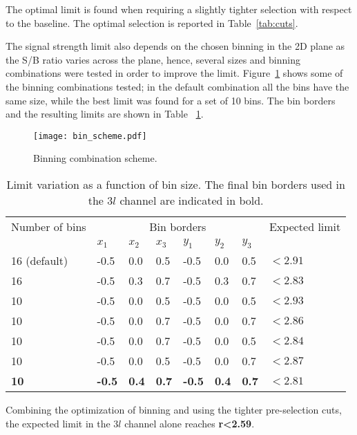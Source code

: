 The optimal limit is found when requiring a slightly tighter selection with respect to the baseline. The optimal selection is reported in Table~\ref{tab:cuts}.

The signal strength limit also depends on the chosen binning in the 2D plane as the S/B ratio varies across the plane, hence, several sizes and binning combinations were tested in order to improve the limit. Figure~\ref{bins} shows some of the binning combinations tested; in the default combination all the bins have the same size, while the best limit was found for a set of 10 bins. The bin borders and the resulting limits are shown in Table ~\ref{bin_limits}.

\begin{figure} [!h]
 \centering
 \texttt{[image: bin\_scheme.pdf]} 
\caption{Binning combination scheme.}
\label{bins}
\end{figure}

\begin{table}[h!]
\centering
\begin{tabular}{llllllll}\hline
Number of bins  & \multicolumn{6}{c}{Bin borders}  & Expected limit \\%
                &$x_1$&$x_2$&$x_3$&$y_1$&$y_2$&$y_3$&\\\hline           
16 (default)    &-0.5 & 0.0 & 0.5 &-0.5 & 0.0 & 0.5 & $<2.91$\\
16              &-0.5 & 0.3 & 0.7 &-0.5 & 0.3 & 0.7 & $<2.83$\\
10              &-0.5 & 0.0 & 0.5 &-0.5 & 0.0 & 0.5 & $<2.93$\\
10              &-0.5 & 0.0 & 0.7 &-0.5 & 0.0 & 0.7 & $<2.86$\\
10              &-0.5 & 0.0 & 0.7 &-0.5 & 0.0 & 0.5 & $<2.84$\\
10              &-0.5 & 0.0 & 0.5 &-0.5 & 0.0 & 0.7 & $<2.87$\\
\textbf{10}     &\textbf{-0.5} &\textbf{0.4} &\textbf{0.7} &\textbf{-0.5} &\textbf{0.4} &\textbf{0.7} &$\mathbf{<2.81}$\\\hline
\end{tabular}
\caption[Limit variation as a function of bin size, $3l$ channel.]{Limit variation as a function of bin size. The final bin borders used in the $3l$ channel are indicated in bold.}
\label{bin_limits}
\end{table}

Combining the optimization of binning and using the tighter pre-selection cuts, the expected limit in the $3l$ channel alone reaches \textbf{r<2.59}.

